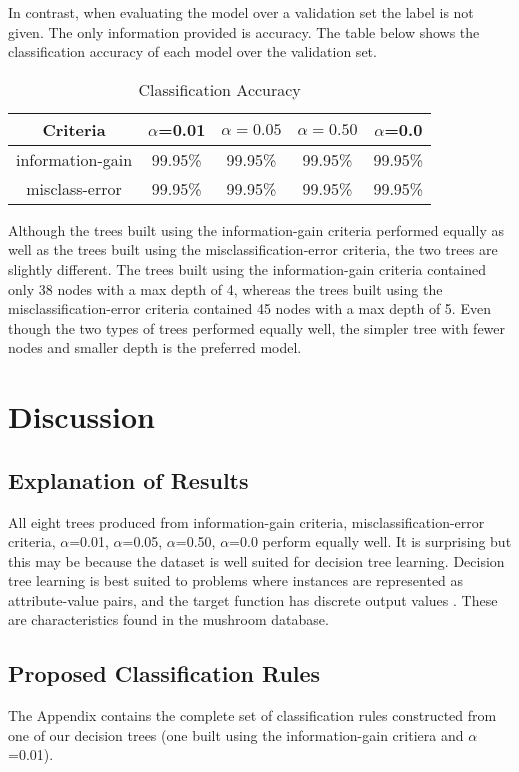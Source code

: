 \documentclass{IEEEtran}
\begin{document}
In contrast, when evaluating the model over a validation set the label
is not given. The only information provided is accuracy. The table
below shows the classification accuracy of each model over the
validation set.

\begin{table}[ht]
  \caption{Classification Accuracy}
  \centering
  \begin{tabular}{c c c c c}
  \hline\hline
  Criteria & $\alpha$=0.01 & $\alpha=0.05$ & $\alpha=0.50$ & $\alpha$=0.0 \\ [0.5ex]
  \hline
  information-gain & 99.95\% & 99.95\% & 99.95\% & 99.95\% \\
  misclass-error   & 99.95\% & 99.95\% & 99.95\% & 99.95\% \\ [1ex]
  \hline
  \end{tabular}
  \label{table:nonlin}
\end{table}

Although the trees built using the information-gain criteria performed
equally as well as the trees built using the misclassification-error
criteria, the two trees are slightly different. The trees built using
the information-gain criteria contained only 38 nodes with a max depth
of 4, whereas the trees built using the misclassification-error
criteria contained 45 nodes with a max depth of 5. Even though the two
types of trees performed equally well, the simpler tree with fewer
nodes and smaller depth is the preferred model.

\section{Discussion}
\subsection{Explanation of Results}
All eight trees produced from information-gain criteria,
misclassification-error criteria, $\alpha$=0.01, $\alpha$=0.05, $\alpha$=0.50,
$\alpha$=0.0 perform equally well. It is surprising but this may be because
the dataset is well suited for decision tree learning. Decision tree
learning is best suited to problems where instances are represented as
attribute-value pairs, and the target function has discrete output
values \parencite{mitchell1997machine}. These are characteristics
found in the mushroom database.

\subsection{Proposed Classification Rules}
The Appendix contains the complete set of classification rules
constructed from one of our decision trees (one built using the
information-gain critiera and $\alpha$=0.01). 
\end{document}

